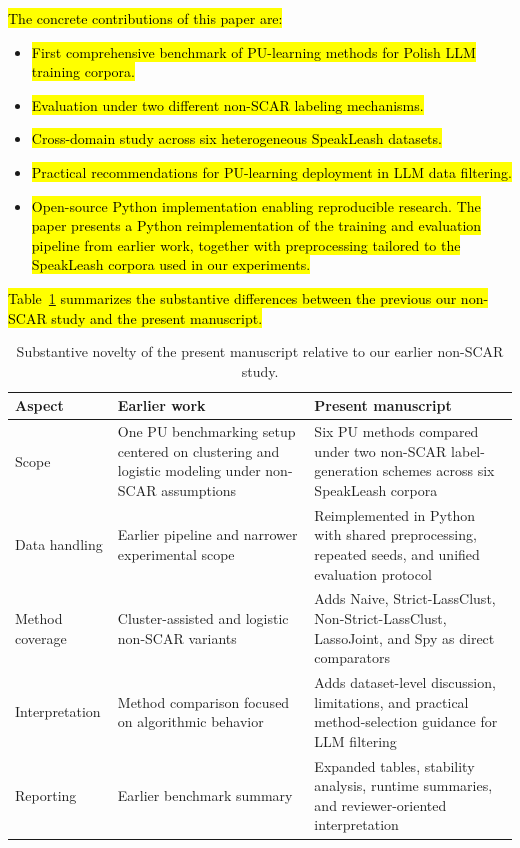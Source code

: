 \documentclass[applsci,article,submit,pdftex,moreauthors]{Definitions/mdpi}
\newcommand{\rev}[1]{\hl{#1}}
\begin{document}
\rev{The concrete contributions of this paper are:}
\begin{itemize}
\item \rev{First comprehensive benchmark of PU-learning methods for Polish LLM training corpora.}
\item \rev{Evaluation under two different non-SCAR labeling mechanisms.}
\item \rev{Cross-domain study across six heterogeneous SpeakLeash datasets.}
\item \rev{Practical recommendations for PU-learning deployment in LLM data filtering.}
\item \rev{Open-source Python implementation enabling reproducible research. The paper presents a Python reimplementation of the training and evaluation pipeline from earlier work, together with preprocessing tailored to the SpeakLeash corpora used in our experiments. }
\end{itemize}

\rev{Table~\ref{tab:novelty_comparison} summarizes the substantive differences between the previous our non-SCAR study and the present manuscript.}

\begin{table}[t]
\centering
\caption{Substantive novelty of the present manuscript relative to our earlier non-SCAR study.}
\label{tab:novelty_comparison}
\small
\begin{tabularx}{\textwidth}{l>{\raggedright\arraybackslash}X>{\raggedright\arraybackslash}X}
\toprule
\textbf{Aspect} & \textbf{Earlier work} & \textbf{Present manuscript} \\
\midrule
Scope & One PU benchmarking setup centered on clustering and logistic modeling under non-SCAR assumptions & Six PU methods compared under two non-SCAR label-generation schemes across six SpeakLeash corpora \\
Data handling & Earlier pipeline and narrower experimental scope & Reimplemented in Python with shared preprocessing, repeated seeds, and unified evaluation protocol \\
Method coverage & Cluster-assisted and logistic non-SCAR variants & Adds Naive, Strict-LassClust, Non-Strict-LassClust, LassoJoint, and Spy as direct comparators \\
Interpretation & Method comparison focused on algorithmic behavior & Adds dataset-level discussion, limitations, and practical method-selection guidance for LLM filtering \\
Reporting & Earlier benchmark summary & Expanded tables, stability analysis, runtime summaries, and reviewer-oriented interpretation \\
\bottomrule
\end{tabularx}
\end{table}
\end{document}
